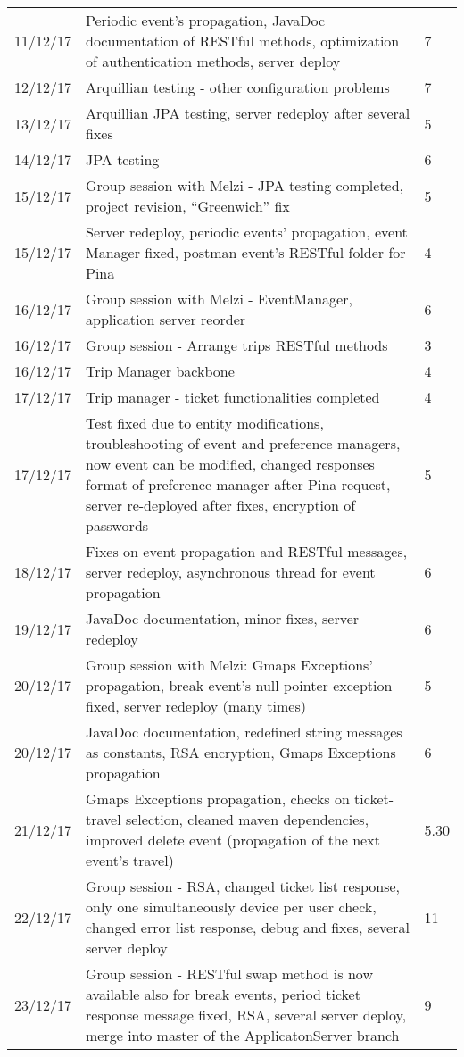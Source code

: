 \begin{longtable}{ p{2cm} p{10cm} p{3cm}}
	11/12/17 & Periodic event's propagation, JavaDoc documentation of RESTful methods, optimization of authentication methods, server deploy & 7 \\
	12/12/17 & Arquillian testing - other configuration problems & 7 \\
	13/12/17 & Arquillian JPA testing, server redeploy after several fixes & 5 \\
	14/12/17 & JPA testing & 6 \\
	15/12/17 & Group session with Melzi - JPA testing completed, project revision, “Greenwich” fix & 5 \\
	15/12/17 & Server redeploy, periodic events' propagation, event Manager fixed, postman event's RESTful folder for Pina & 4 \\
	16/12/17 & Group session with Melzi - EventManager, application server reorder  & 6 \\
	16/12/17 & Group session - Arrange trips RESTful methods & 3 \\
	16/12/17 & Trip Manager backbone & 4 \\
	17/12/17 & Trip manager - ticket functionalities completed & 4 \\
	17/12/17 & Test fixed due to entity modifications, troubleshooting of event and preference managers, now event can be modified, changed responses format of preference manager after Pina request, server re-deployed after fixes, encryption of passwords & 5 \\
	18/12/17 & Fixes on event propagation and RESTful messages, server redeploy, asynchronous thread for event propagation
 & 6 \\
	19/12/17 & JavaDoc documentation, minor fixes, server redeploy & 6 \\
	20/12/17 & Group session with Melzi: Gmaps Exceptions' propagation, break event's null pointer exception fixed, server redeploy (many times) & 5 \\
	20/12/17 & JavaDoc documentation, redefined string messages as constants, RSA encryption, Gmaps Exceptions propagation & 6 \\
	21/12/17 & Gmaps Exceptions propagation, checks on ticket-travel selection, cleaned maven dependencies, improved delete event (propagation of the next event's travel) & 5.30 \\
	22/12/17 & Group session - RSA, changed ticket list response, only one simultaneously device per user check, changed error list response, debug and fixes, several server deploy & 11 \\
	23/12/17 & Group session - RESTful swap method is now available also for break events, period ticket response message fixed, RSA, several server deploy, merge into master of the ApplicatonServer branch & 9 \\

\end{longtable}
